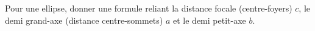 Pour une ellipse, donner une formule reliant la distance focale (centre-foyers) $c$, le demi grand-axe (distance centre-sommets) $a$ et le demi petit-axe $b$.
\bigskip